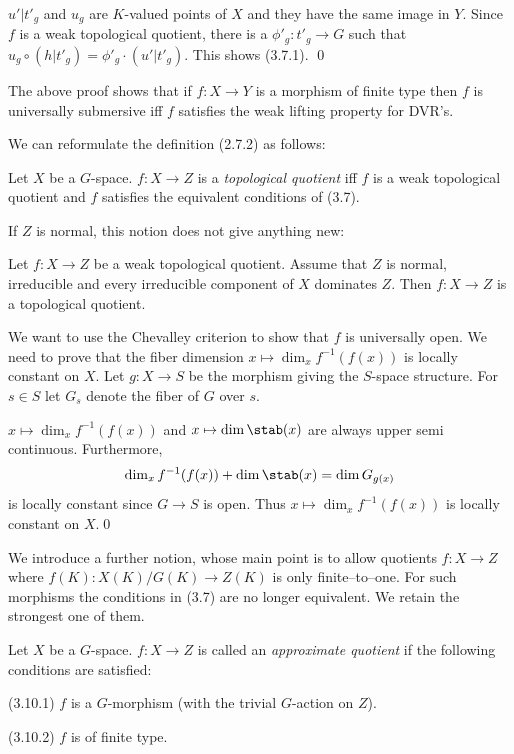 $u'|t'_g$ and $u_g$ are $K$-valued points of $X$ and they have the same
image in $Y$. Since  $f$ is a  weak topological
quotient,  there is a $\phi'_g:t'_g\to G$ such that
$u_g\circ (h|t'_g)=\phi'_g\cdot (u'|t'_g)$.  This shows
 (3.7.1).
\qed\enddemo


 The above proof shows that if $f:X\to Y$ is a morphism of
finite type then
 $f$ is universally submersive
iff $f$ satisfies the   weak lifting property for DVR's.
\enddemo


We can reformulate the definition (2.7.2)  as follows:


  Let $X$ be a $G$-space. $f:X\to Z$ is   a {\it
topological quotient} iff  $f$ is a weak topological quotient and $f$ satisfies
the equivalent conditions of (3.7).
\enddemo



If $Z$ is normal, this notion does not give anything new:

 Let $f:X\to Z$ be a  weak topological quotient.
Assume that
$Z$ is normal, irreducible  and every irreducible component of $X$ dominates
$Z$. Then
$f:X\to Z$ is a topological quotient.
\endproclaim

\demop  We want to use the Chevalley criterion   \cite {EGA, IV.14.4.4}  to
show that
$f$ is universally open. We need to prove that the fiber
dimension  $x\mapsto \dim_x f^{-1}(f(x))$ is locally constant on $X$.
Let $g:X\to S$ be the   morphism  giving the $S$-space structure. For
$s\in S$ let
$G_s$ denote the fiber of $G$ over $s$.

$x\mapsto \dim_x f^{-1}(f(x))$ and $x\mapsto \dim \stab(x)$  are  always upper
semi continuous. Furthermore,
$$
\dim_x f^{-1}(f(x))+\dim \stab(x)=\dim G_{g(x)}
$$
is locally constant since $G\to S$ is open. Thus $x\mapsto \dim_x f^{-1}(f(x))$
is locally constant on
$X$.\qed\enddemo



We introduce a further notion, whose main point is to allow quotients
 $f:X\to Z$ where
$f(K):X(K)/G(K)\to Z(K)$ is only finite--to--one. For such morphisms the
conditions in (3.7) are no longer equivalent. We retain the strongest one of
them.

  Let $X$ be a $G$-space. $f:X\to Z$ is called an {\it
approximate quotient} if the following conditions are satisfied:

(3.10.1) $f$ is a $G$-morphism
 (with the trivial $G$-action on $Z$).

(3.10.2) $f$ is of finite type.

